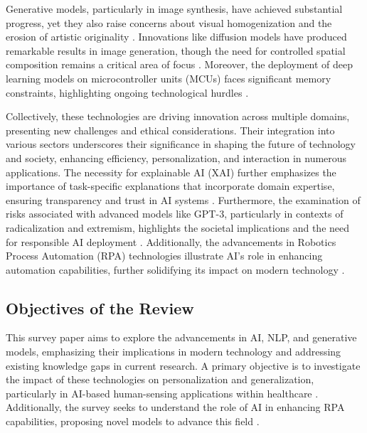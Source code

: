 Generative models, particularly in image synthesis, have achieved substantial progress, yet they also raise concerns about visual homogenization and the erosion of artistic originality \cite{palmini2024patternscreativityuserinput}. Innovations like diffusion models have produced remarkable results in image generation, though the need for controlled spatial composition remains a critical area of focus \cite{zhang2023adding}. Moreover, the deployment of deep learning models on microcontroller units (MCUs) faces significant memory constraints, highlighting ongoing technological hurdles \cite{zheng2024vmcucoordinatedmemorymanagement}.



Collectively, these technologies are driving innovation across multiple domains, presenting new challenges and ethical considerations. Their integration into various sectors underscores their significance in shaping the future of technology and society, enhancing efficiency, personalization, and interaction in numerous applications. The necessity for explainable AI (XAI) further emphasizes the importance of task-specific explanations that incorporate domain expertise, ensuring transparency and trust in AI systems \cite{chiaburu2024copronnconceptbasedprototypicalnearest}. Furthermore, the examination of risks associated with advanced models like GPT-3, particularly in contexts of radicalization and extremism, highlights the societal implications and the need for responsible AI deployment \cite{mcguffie2020radicalizationrisksgpt3advanced}. Additionally, the advancements in Robotics Process Automation (RPA) technologies illustrate AI's role in enhancing automation capabilities, further solidifying its impact on modern technology \cite{pandy2024advancementsroboticsprocessautomation}.



\subsection{Objectives of the Review} \label{subsec:Objectives of the Review}



This survey paper aims to explore the advancements in AI, NLP, and generative models, emphasizing their implications in modern technology and addressing existing knowledge gaps in current research. A primary objective is to investigate the impact of these technologies on personalization and generalization, particularly in AI-based human-sensing applications within healthcare \cite{kaur2024cropcontextwiserobuststatic}. Additionally, the survey seeks to understand the role of AI in enhancing RPA capabilities, proposing novel models to advance this field \cite{pandy2024advancementsroboticsprocessautomation}.



